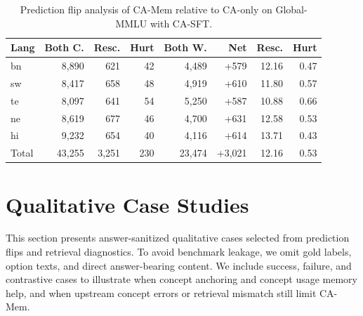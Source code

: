\documentclass[11pt]{article}
\newcommand{\FloatBarrier}{}
\begin{document}
\begin{table}[!htbp]
\centering
\scriptsize
\setlength{\tabcolsep}{2pt}
\renewcommand{\arraystretch}{0.94}
\begin{tabular}{l r r r r r r r}
\hline
Lang & Both C. & Resc. & Hurt & Both W. & Net & Resc. & Hurt \\
\hline
bn & 8,890 & 621 & 42 & 4,489 & +579 & 12.16 & 0.47 \\
sw & 8,417 & 658 & 48 & 4,919 & +610 & 11.80 & 0.57 \\
te & 8,097 & 641 & 54 & 5,250 & +587 & 10.88 & 0.66 \\
ne & 8,619 & 677 & 46 & 4,700 & +631 & 12.58 & 0.53 \\
hi & 9,232 & 654 & 40 & 4,116 & +614 & 13.71 & 0.43 \\
Total & 43,255 & 3,251 & 230 & 23,474 & +3,021 & 12.16 & 0.53 \\
\hline
\end{tabular}
\caption{Prediction flip analysis of CA-Mem relative to CA-only on Global-MMLU with CA-SFT.}
\label{tab:prediction_flip}
\end{table}
\FloatBarrier

\section{Qualitative Case Studies}
\label{sec:appendix_cases}

This section presents answer-sanitized qualitative cases selected from prediction flips and retrieval diagnostics. To avoid benchmark leakage, we omit gold labels, option texts, and direct answer-bearing content. We include success, failure, and contrastive cases to illustrate when concept anchoring and concept usage memory help, and when upstream concept errors or retrieval mismatch still limit CA-Mem.

\begin{table}[!htbp]
\centering
\scriptsize
\setlength{\tabcolsep}{3pt}
\renewcommand{\arraystretch}{0.95}
\caption{Summary of answer-sanitized qualitative cases.}
\label{tab:case_summary}
\end{table}
\end{document}
